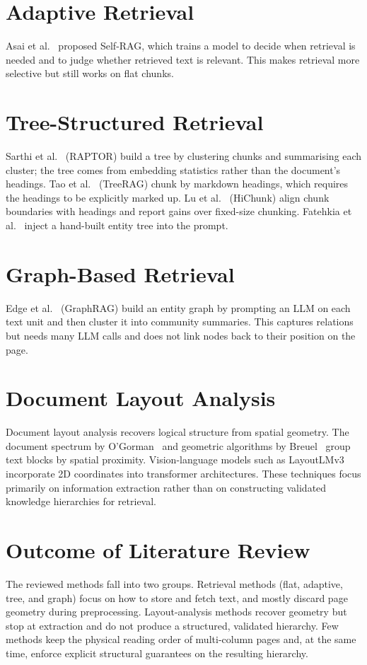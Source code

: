 \documentclass[12pt,a4paper]{report}
\begin{document}
\section{Adaptive Retrieval}
Asai et al.~\cite{asai2024selfrag} proposed Self-RAG, which trains a model to decide
when retrieval is needed and to judge whether retrieved text is relevant. This makes
retrieval more selective but still works on flat chunks.

\section{Tree-Structured Retrieval}
Sarthi et al.~\cite{sarthi2024raptor} (RAPTOR) build a tree by clustering chunks and
summarising each cluster; the tree comes from embedding statistics rather than the
document's headings. Tao et al.~\cite{tao2025treerag} (TreeRAG) chunk by markdown
headings, which requires the headings to be explicitly marked up. Lu et
al.~\cite{lu2026hichunk} (HiChunk) align chunk boundaries with headings and report
gains over fixed-size chunking. Fatehkia et al.~\cite{fatehkia2024trag} inject a
hand-built entity tree into the prompt.

\section{Graph-Based Retrieval}
Edge et al.~\cite{edge2024graphrag} (GraphRAG) build an entity graph by prompting an LLM
on each text unit and then cluster it into community summaries. This captures relations
but needs many LLM calls and does not link nodes back to their position on the page.

\section{Document Layout Analysis}
Document layout analysis recovers logical structure from spatial geometry. The document
spectrum by O'Gorman~\cite{ogorman1993document} and geometric algorithms by Breuel~\cite{breuel2002high}
group text blocks by spatial proximity. Vision-language models such as LayoutLMv3~\cite{huang2022layoutlmv3}
incorporate 2D coordinates into transformer architectures. These techniques focus primarily on
information extraction rather than on constructing validated knowledge hierarchies for retrieval.

\section{Outcome of Literature Review}
The reviewed methods fall into two groups. Retrieval methods (flat, adaptive, tree, and
graph) focus on how to store and fetch text, and mostly discard page geometry during
preprocessing. Layout-analysis methods recover geometry but stop at extraction and do
not produce a structured, validated hierarchy. Few methods keep the physical reading
order of multi-column pages and, at the same time, enforce explicit structural
guarantees on the resulting hierarchy.
\end{document}
